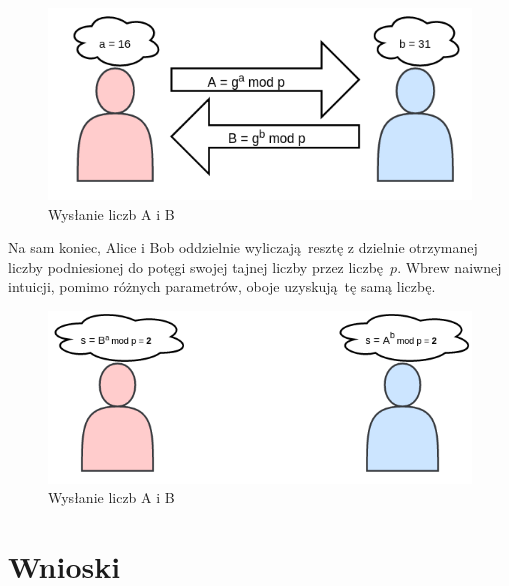 \documentclass[12pt]{article}
\begin{document}
\begin{figure}[h!]
	\begin{center}
		\includegraphics[scale=0.3]{4-dh-diagram-2}
	\end{center}
	\caption{Wysłanie liczb A i B}
\end{figure}

Na sam koniec, Alice i Bob oddzielnie wyliczają resztę z dzielnie otrzymanej liczby podniesionej do potęgi swojej tajnej liczby przez liczbę $p$.
Wbrew naiwnej intuicji, pomimo różnych parametrów, oboje uzyskują tę samą liczbę.

\begin{figure}[h!]
	\begin{center}
		\includegraphics[scale=0.3]{4-dh-diagram-3}
	\end{center}
	\caption{Wysłanie liczb A i B}
\end{figure}

\section{Wnioski}
\end{document}
